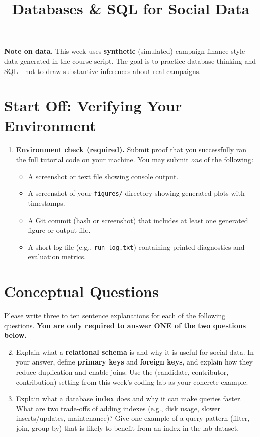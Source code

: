 \documentclass[11pt]{article}
\title{ Databases \& SQL for Social Data}
\author{ }
\date{ }
\begin{document}
\maketitle

\noindent \textbf{Note on data.} This week uses \textbf{synthetic} (simulated) campaign finance-style data generated in the course script. The goal is to practice database thinking and SQL---not to draw substantive inferences about real campaigns.

\section*{Start Off: Verifying Your Environment}

\begin{enumerate}
\item \textbf{Environment check (required).}  
Submit proof that you successfully ran the full tutorial code on your machine. You may submit \emph{one} of the following:
\begin{itemize}
  \item A screenshot or text file showing console output.
  \item A screenshot of your \texttt{figures/} directory showing generated plots with timestamps.
  \item A Git commit (hash or screenshot) that includes at least one generated figure or output file.
  \item A short log file (e.g., \texttt{run\_log.txt}) containing printed diagnostics and evaluation metrics.
\end{itemize}
\end{enumerate}

\section*{Conceptual Questions}
Please write three to ten sentence explanations for each of the following questions. \textbf{You are only required to answer ONE of the two questions below.} \bigskip
 
\begin{enumerate}
\setcounter{enumi}{1}

\item Explain what a \textbf{relational schema} is and why it is useful for social data. In your answer, define \textbf{primary keys} and \textbf{foreign keys}, and explain how they reduce duplication and enable joins. Use the (candidate, contributor, contribution) setting from this week's coding lab as your concrete example.

\item Explain what a database \textbf{index} does and why it can make queries faster. What are two trade-offs of adding indexes (e.g., disk usage, slower inserts/updates, maintenance)? Give one example of a query pattern (filter, join, group-by) that is likely to benefit from an index in the lab dataset.

  \end{enumerate}
\end{document}
